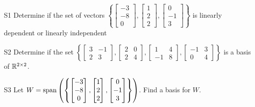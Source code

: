 \documentclass{sbgLAsemi}
\begin{document}
\begin{problem}{S1}
Determine if the set of vectors $\left\{ \begin{bmatrix} -3 \\ -8 \\ 0 \end{bmatrix}, \begin{bmatrix} 1 \\ 2 \\ 2 \end{bmatrix}, \begin{bmatrix} 0 \\ -1 \\ 3 \end{bmatrix} \right\}$ is  linearly dependent or linearly independent
\end{problem}

\begin{problem}{S2}
  Determine if the set \(\left\{
    \begin{bmatrix} 3 & -1 \\ 2 &3 \end{bmatrix},
    \begin{bmatrix} 2 & 0 \\ 2 & 4\end{bmatrix},
    \begin{bmatrix} 1 & 4 \\ -1 & 8\end{bmatrix},
    \begin{bmatrix} -1 & 3 \\ 0 & 4\end{bmatrix}
  \right\}\) is a basis of $\mathbb{R}^{2\times 2}$.
\end{problem}

\begin{problem}{S3}
Let $W = {\rm span} \left( \left\{  \begin{bmatrix} -3 \\ -8 \\ 0 \end{bmatrix}, \begin{bmatrix} 1 \\ 2 \\ 2 \end{bmatrix}, \begin{bmatrix} 0 \\ -1 \\ 3 \end{bmatrix} \right\} \right)$.   Find a basis for $W$.
\end{problem}
\end{document}
